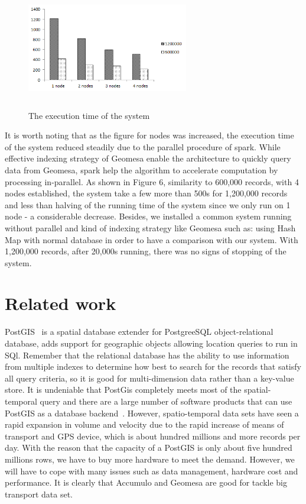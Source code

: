 \documentclass{acm_proc_article-sp}
\begin{document}
	\begin{figure}
		\centering
		\includegraphics[height=150pt,width=200pt]{figure6}
		\caption{The execution time of the system}
	\end{figure}

\setlength{\parindent}{0.7cm} It is worth noting that as the figure for nodes was increased, the execution time of the system reduced steadily due to the parallel procedure of spark. While effective indexing strategy of Geomesa enable the architecture to quickly query data from Geomesa, spark help the algorithm to accelerate computation by processing in-parallel. As shown in Figure 6, similarity to 600,000 records, with 4 nodes established, the system take a few more than 500s for 1,200,000 records and less than halving of the running time of the system since we only run on 1 node - a considerable decrease. Besides, we installed a common system running without parallel and kind of indexing strategy like Geomesa such as: using Hash Map with normal database in order to have a comparison with our system. With 1,200,000 records, after 20,000s running, there was no signs of stopping of the system.
	
\section{Related work}

PostGIS~\cite{posgis} is a spatial database extender for PostgreeSQL object-relational database, adds support for geographic objects allowing location queries to run in SQl. Remember that the relational database has the ability to use information from multiple indexes to determine how best to search for the records that satisfy all query criteria, so it is good for multi-dimension data rather than a key-value store. It is undeniable that PostGis completely meets most of the spatial-temporal query and there are a large number of software products that can use PostGIS as a database backend~\cite{backendposgis}. However, spatio-temporal data sets have seen a rapid expansion in volume and velocity due to the rapid increase of means of transport and GPS device, which is about hundred millions and more records per day. With the reason that the capacity of a PostGIS is only about five hundred millions rows, we have to buy more hardware to meet the demand. However, we will have to cope with many issues such as data management, hardware cost and performance. It is clearly that Accumulo and Geomesa are good for tackle big transport data set.
\end{document}

